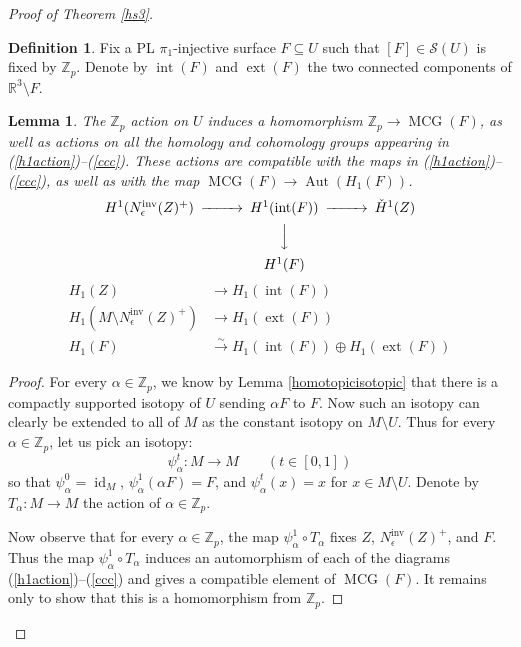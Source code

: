 \documentclass[12pt]{article}
\theoremstyle{plain}
\newtheorem{lemma}[theorem]{Lemma}
\theoremstyle{definition}
\newtheorem{definition}[theorem]{Definition}
\theoremstyle{remark}
\numberwithin{equation}{section}
\begin{document}
\begin{proof}[Proof of Theorem \ref{hs3}]
\begin{definition}
Fix a PL $\pi_1$-injective surface $F\subseteq U$ such that $[F]\in\mathcal S(U)$ is fixed by $\mathbb Z_p$.  Denote by $\operatorname{int}(F)$ and $\operatorname{ext}(F)$ the two connected components of $\mathbb R^3\setminus F$.
\end{definition}

\begin{lemma}\label{coherentactions}
The $\mathbb Z_p$ action on $U$ induces a homomorphism $\mathbb Z_p\to\operatorname{MCG}(F)$, as well as actions on all the homology and cohomology groups appearing in (\ref{h1action})--(\ref{ccc}).  These actions are compatible with the maps in (\ref{h1action})--(\ref{ccc}), as well as with the map $\operatorname{MCG}(F)\to\operatorname{Aut}(H_1(F))$.
\begin{equation}\label{h1action}
\begin{CD}
H^1(N^{\operatorname{inv}}_\epsilon(Z)^+)@>>>H^1(\operatorname{int}(F))@>>>\check H^1(Z)\cr
@.@VVV\cr
@.H^1(F)
\end{CD}
\end{equation}
\begin{align}
\label{aaa}H_1(Z)&\to H_1(\operatorname{int}(F))\\
\label{bbb}H_1(M\setminus N^{\operatorname{inv}}_\epsilon(Z)^+)&\to H_1(\operatorname{ext}(F))\\
\label{ccc}H_1(F)&\xrightarrow\sim H_1(\operatorname{int}(F))\oplus H_1(\operatorname{ext}(F))
\end{align}
\end{lemma}

\begin{proof}
For every $\alpha\in\mathbb Z_p$, we know by Lemma \ref{homotopicisotopic} that there is a compactly supported isotopy of $U$ sending $\alpha F$ to $F$.  Now such an isotopy can clearly be extended to all of $M$ as the constant isotopy on $M\setminus U$.  Thus for every $\alpha\in\mathbb Z_p$, let us pick an isotopy:
\begin{equation}
\psi_\alpha^t:M\to M\qquad(t\in[0,1])
\end{equation}
so that $\psi_\alpha^0=\operatorname{id}_M$, $\psi_\alpha^1(\alpha F)=F$, and $\psi_\alpha^t(x)=x$ for $x\in M\setminus U$.  Denote by $T_\alpha:M\to M$ the action of $\alpha\in\mathbb Z_p$.

Now observe that for every $\alpha\in\mathbb Z_p$, the map $\psi_\alpha^1\circ T_\alpha$ fixes $Z$, $N^{\operatorname{inv}}_\epsilon(Z)^+$, and $F$.  Thus the map $\psi_\alpha^1\circ T_\alpha$ induces an automorphism of each of the diagrams (\ref{h1action})--(\ref{ccc}) and gives a compatible element of $\operatorname{MCG}(F)$.  It remains only to show that this is a homomorphism from $\mathbb Z_p$.


\end{proof}
\end{proof}
\end{document}
